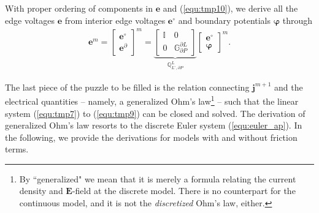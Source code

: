 \documentclass{report}
\begin{document}
With proper ordering of components in $\mathbf{e}$ and (\ref{equ:tmp10}), we derive all the edge voltages $\mathbf{e}$ from interior edge voltages $\mathbf{e}^\circ$ and boundary potentials $\bm{\varphi}$ through 
\begin{align*}
    \mathbf{e}^m =
    \begin{bmatrix}
    \mathbf{e}^\circ \\ \mathbf{e}^\partial
    \end{bmatrix}^m =
    \underbrace{
    \begin{bmatrix}
    \mathbb{I} & 0 \\ 0 & \mathbb{G}^{\partial L}_{\partial P}
    \end{bmatrix}}_{\mathbb{Q}_{L^\circ,\partial P}^{L}}
    \begin{bmatrix}
    \mathbf{e}^\circ \\ \bm{\varphi}
    \end{bmatrix}^m.
\end{align*}

The last piece of the puzzle to be filled is the relation connecting $\mathbf{j}^{m+1}$ and the electrical quantities -- namely, a generalized Ohm's law\footnote{By ``generalized" we mean that it is merely a formula relating the current density and $\mathbf{E}$-field at the discrete model. There is no counterpart for the continuous model, and it is not the \emph{discretized} Ohm's law, either.} -- such that the linear system (\ref{equ:tmp7}) to (\ref{equ:tmp9}) can be closed and solved. The derivation of generalized Ohm's law resorts to the discrete Euler system (\ref{equ:euler_ap}). In the following, we provide the derivations for models with and without friction terms. 
\end{document}
